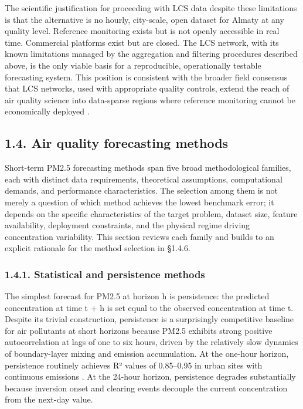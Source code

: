 The scientific justification for proceeding with LCS data despite these limitations is that the alternative is no hourly, city-scale, open dataset for Almaty at any quality level. Reference monitoring exists but is not openly accessible in real time. Commercial platforms exist but are closed. The LCS network, with its known limitations managed by the aggregation and filtering procedures described above, is the only viable basis for a reproducible, operationally testable forecasting system. This position is consistent with the broader field consensus that LCS networks, used with appropriate quality controls, extend the reach of air quality science into data-sparse regions where reference monitoring cannot be economically deployed \cite{snyder2013paradigm}.

\subsection{1.4. Air quality forecasting methods}\label{air-quality-forecasting-methods}

Short-term PM2.5 forecasting methods span five broad methodological families, each with distinct data requirements, theoretical assumptions, computational demands, and performance characteristics. The selection among them is not merely a question of which method achieves the lowest benchmark error; it depends on the specific characteristics of the target problem, dataset size, feature availability, deployment constraints, and the physical regime driving concentration variability. This section reviews each family and builds to an explicit rationale for the method selection in §1.4.6.

\subsubsection{1.4.1. Statistical and persistence methods}\label{statistical-and-persistence-methods}

The simplest forecast for PM2.5 at horizon h is persistence: the predicted concentration at time t + h is set equal to the observed concentration at time t. Despite its trivial construction, persistence is a surprisingly competitive baseline for air pollutants at short horizons because PM2.5 exhibits strong positive autocorrelation at lags of one to six hours, driven by the relatively slow dynamics of boundary-layer mixing and emission accumulation. At the one-hour horizon, persistence routinely achieves R² values of 0.85--0.95 in urban sites with continuous emissions \cite{mahajan2018shortterm}. At the 24-hour horizon, persistence degrades substantially because inversion onset and clearing events decouple the current concentration from the next-day value.

